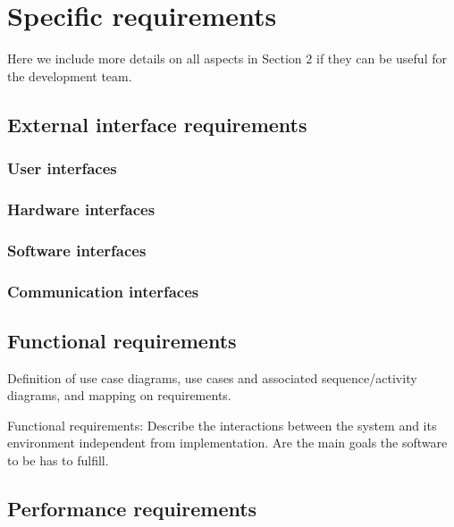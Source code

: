 \section{Specific requirements}
\label{sect:Specificrequirements}

Here we include more details on all aspects in Section $2$ if they can be useful for the development team. 

\subsection{External interface requirements}
\label{subsect:ecternalinterfacerequirements}

\subsubsection{User interfaces}
\label{subsubsect:userinterfaces}

\subsubsection{Hardware interfaces}
\label{subsubsect:hardwareinterfaces}

\subsubsection{Software interfaces}
\label{subsubsect:softwareinterfaces}

\subsubsection{Communication interfaces}
\label{subsubsect:communicationinterfaces}

\subsection{Functional requirements}
\label{subsect:functionalrequirements}

Definition of use case diagrams, use cases and associated
sequence/activity diagrams, and mapping on requirements.

Functional requirements: Describe the interactions between the system and its environment
independent from implementation. Are the main goals the software to be has to fulfill.

\subsection{Performance requirements}
\label{subsect:performancerequirements}

